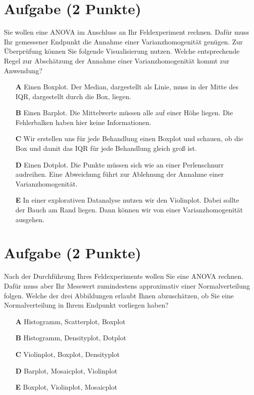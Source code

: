 \documentclass[a4paper, 9pt]{scrartcl}\usepackage[]{graphicx}\usepackage[]{xcolor}
\begin{document}
\section{Aufgabe \hfill (2 Punkte)}



Sie wollen eine ANOVA im Anschluss an Ihr Feldexperiment rechnen. Dafür muss Ihr gemessener Endpunkt die Annahme einer Varianzhomogenität genügen. Zur Überprüfung können Sie folgende Visualisierung nutzen. Welche entsprechende Regel zur Abschätzung der Annahme einer Varianzhomogenität kommt zur Anwendung?



\begin{enumerate}
\item [\textbf{A} \msquare] Einen Boxplot. Der Median, dargestellt als Linie, muss in der Mitte des IQR, dargestellt durch die Box, liegen.
\item [\textbf{B} \msquare] Einen Barplot. Die Mittelwerte müssen alle auf einer Höhe liegen. Die Fehlerbalken haben hier keine Informationen.
\item [\textbf{C} \msquare] Wir erstellen uns für jede Behandlung einen Boxplot und schauen, ob die Box und damit das IQR für jede Behandlung gleich groß ist.
\item [\textbf{D} \msquare] Einen Dotplot. Die Punkte müssen sich wie an einer Perlenschnurr audreihen. Eine Abweichung führt zur Ablehnung der Annahme einer Varianzhomogenität.
\item [\textbf{E} \msquare] In einer explorativen Datanalyse nutzen wir den Violinplot. Dabei sollte der Bauch am Rand liegen. Dann können wir von einer Varianzhomogenität ausgehen.
\end{enumerate}

\section{Aufgabe \hfill (2 Punkte)}




Nach der Durchführung Ihres Feldexperiments wollen Sie eine ANOVA rechnen. Dafür muss aber Ihr Messwert zumindestens approximativ einer Normalverteilung folgen. Welche der drei Abbildungen erlaubt Ihnen abzuschätzen, ob Sie eine Normalverteilung in Ihrem Endpunkt vorliegen haben?





\begin{enumerate}
\item [\textbf{A} \msquare] Histogramm, Scatterplot, Boxplot
\item [\textbf{B} \msquare] Histogramm, Densityplot, Dotplot
\item [\textbf{C} \msquare] Violinplot, Boxplot, Densityplot
\item [\textbf{D} \msquare] Barplot, Mosaicplot, Violinplot
\item [\textbf{E} \msquare] Boxplot, Violinplot, Mosaicplot
\end{enumerate} 
\end{document}
